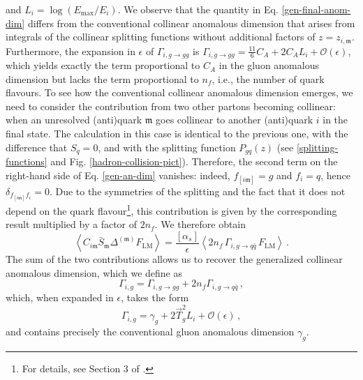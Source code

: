 \documentclass[a4paper, 12pt]{book}
\newcommand{\um}{\mathfrak{m}}
\begin{document}
and $L_i=\log{\left(E_{\mathrm{max}}/E_i\right)}$. We observe that the quantity in Eq. \ref{gen-final-anom-dim} differs from the conventional collinear anomalous dimension that arises from integrals of the collinear splitting functions without additional factors of $z=z_{i,\um}$. Furthermore, the expansion in $\epsilon$ of $\Gamma_{i,g \to gg}$ is $\Gamma_{i,g \to gg}=\frac{11}{6}C_A+2C_AL_i+\mathcal{O}(\epsilon)$, which yields exactly the term proportional to $C_A$ in the gluon anomalous dimension but lacks the term proportional to $n_f$, i.e., the number of quark flavours. To see how the conventional collinear anomalous dimension emerges, we need to consider the contribution from two other partons becoming collinear: when an unresolved (anti)quark $\um$ goes collinear to another (anti)quark $i$ in the final state. The calculation in this case is identical to the previous one, with the difference that $S_q = 0$, and with the splitting function $P_{gq}(z)$ (see \ref{splitting-functions} and Fig. \ref{hadron-collision-pict}). Therefore, the second term on the right-hand side of Eq. \ref{gen-an-dim} vanishes: indeed, $f_{[i\um]}=g$ and $f_i=q$, hence $\delta_{f_{[i\um]}f_i}=0$. Due to the symmetries of the splitting and the fact that it does not depend on the quark flavour\footnote{For details, see Section 3 of \cite{Devoto:2025kin}.}, this contribution is given by the corresponding result multiplied by a factor of $2n_f$. We therefore obtain
\begin{equation}
  \left<  C_{i\um} \bar{S}_{\um} \Delta^{(\um)} F_{\mathrm{LM}}\right> = \frac{[\alpha_s]}{\epsilon} \left< 2n_f \, \Gamma_{i,g \to q \bar{q}} \, F_{\mathrm{LM}}\right> \, .
\end{equation}
The sum of the two contributions allows us to recover the generalized collinear anomalous dimension, which we define as
\begin{equation}
  \Gamma_{i,g} = \Gamma_{i,g \to gg} + 2n_f \Gamma_{i,g \to q \bar{q}} \, ,
  \label{an-dim-gluon}
\end{equation}
which, when expanded in $\epsilon$, takes the form 
\begin{equation}
  \Gamma_{i,g}=\gamma_g + 2 \vec{T}_g^2 L_i + \mathcal{O}(\epsilon) \, ,
  \label{expansion-an-dim-gluon}
\end{equation}
and contains precisely the conventional gluon anomalous dimension $\gamma_g$. \\
\end{document}
